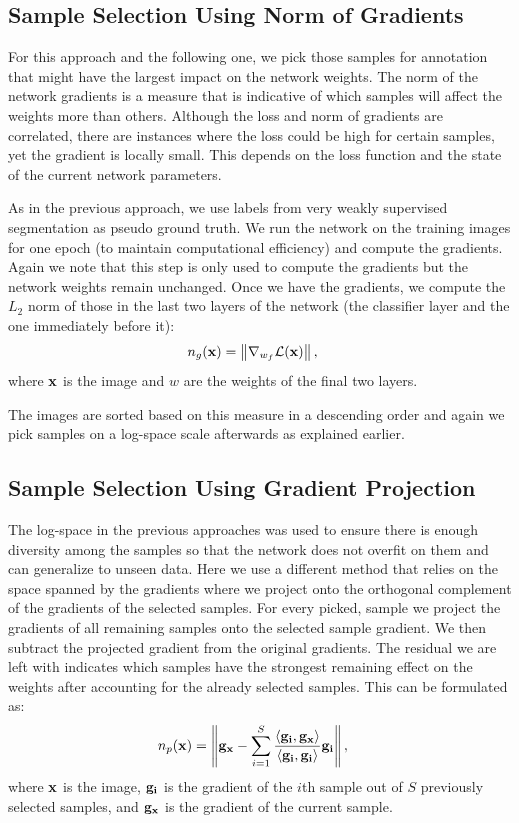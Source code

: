 \documentclass[letterpaper, 10 pt, conference]{ieeeconf}  %
\begin{document}
\subsection{Sample Selection Using Norm of Gradients} \label{sec:grad_norm}
\label{ssec:normgrad}

For this approach and the following one, we pick those samples for annotation that might have the largest impact on the network weights. The norm of the network gradients is a measure that is indicative of which samples will affect the weights more than others. Although the loss and norm of gradients are correlated, there are instances where the loss could be high for certain samples, yet the gradient is locally small. This depends on the loss function and the state of the current network parameters. 

As in the previous approach, we use labels from very weakly supervised segmentation as pseudo ground truth. We run the network on the training images for one epoch (to maintain computational efficiency) and compute the gradients. Again we note that this step is only used to compute the gradients but the network weights remain unchanged. Once we have the gradients, we compute the $L_2$ norm of those in the last two layers of the network (the classifier layer and the one immediately before it):
\begin{align}
n_g(\bold{x}) &=  \left\lVert \nabla_{w_f} \mathcal{L}(\bold{x}) \right\rVert,
\end{align}  
where $\bold{x}$ is the image and $w$ are the weights of the final two layers.

The images are sorted based on this measure in a descending order and again we pick samples on a log-space scale afterwards as explained earlier.

\subsection{Sample Selection Using Gradient Projection} \label{sec:grad_proj}
\label{ssec:gradproj}

The log-space in the previous approaches was used to ensure there is enough diversity among the samples so that the network does not overfit on them and can generalize to unseen data. Here we use a different method that relies on the space spanned by the gradients where we project onto the orthogonal complement of the gradients of the selected samples. For every picked, sample we project the gradients of all remaining samples onto the selected sample gradient. We then subtract the projected gradient from the original gradients. The residual we are left with indicates which samples have the strongest remaining effect on the weights after accounting for the already selected samples. This can be formulated as:
\begin{align}
n_p(\bold{x}) &=  \left\lVert \bold{g_x} - \sum_{i=1}^S \frac{\left\langle \bold{g_i}, \bold{g_x} \right\rangle}{\left\langle \bold{g_i}, \bold{g_i} \right\rangle} \bold{g_i} \right\rVert,
\end{align}
where $\bold{x}$ is the image, $\bold{g_i}$ is the gradient of the $i$th sample out of $S$ previously selected samples, and $\bold{g_x}$ is the gradient of the current sample.
\end{document}
